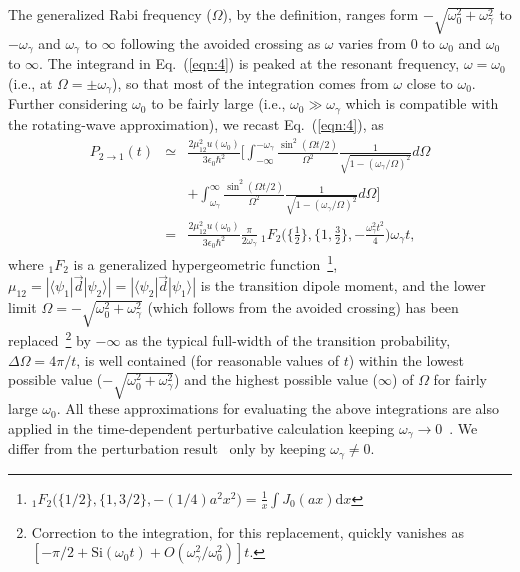 \documentclass[aps,pra,twocolumn,showpacs,preprintnumbers,amsmath,amssymb,footinbib]{revtex4}
\begin{document}
The generalized Rabi frequency ($\Omega$), by the definition, ranges form $-\sqrt{\omega_0^2+\omega_\gamma^2}$ to $-\omega_\gamma$ and $\omega_\gamma$ to $\infty$ following the avoided crossing as $\omega$ varies from $0$ to $\omega_0$ and $\omega_0$ to $\infty$. The integrand in Eq.~(\ref{eqn:4}) is peaked at the resonant frequency, $\omega=\omega_0$ (i.e., at $\Omega=\pm\omega_\gamma$), so that most of the integration comes from $\omega$ close to $\omega_0$.  Further considering $\omega_0$ to be fairly large  (i.e., $\omega_0\gg\omega_\gamma$ which is compatible with the rotating-wave approximation), we recast Eq.~(\ref{eqn:4}), as
\begin{eqnarray}\label{eqn:6}
P_{2\rightarrow1}(t)&\simeq&\frac{2\mu_{12}^2u(\omega_0)}{3\epsilon_0\hbar^2}\bigg[\int_{-\infty}^{-\omega_\gamma}\frac{\sin^2(\Omega t/2)}{\Omega^2}\frac{1}{\sqrt{1-(\omega_\gamma/\Omega)^2}}d\Omega\nonumber\\&&+\int_{\omega_\gamma}^\infty\frac{\sin^2(\Omega t/2)}{\Omega^2}\frac{1}{\sqrt{1-(\omega_\gamma/\Omega)^2}}d\Omega\bigg]\nonumber\\&=&\frac{2\mu_{12}^2u(\omega_0)}{3\epsilon_0\hbar^2}\frac{\pi}{2\omega_\gamma}~_1F_2\big(\{\frac{1}{2}\}, \{1,\frac{3}{2}\}, -\frac{\omega_\gamma^2 t^2}{4}\big)\omega_\gamma t,
\end{eqnarray}
where $_1F_2$ is a generalized hypergeometric function~\footnote{$_1F_2\big(\{1/2\}, \{1, 3/2\}, -(1/4) a^2 x^2\big)=\frac{1}{x}\int J_0(a x)\text{d}x$}, $\mu_{12}=|\langle\psi_1|\vec{d}|\psi_2\rangle|=|\langle\psi_2|\vec{d}|\psi_1\rangle|$ is the transition dipole moment, and the lower limit $\Omega=-\sqrt{\omega_0^2+\omega_\gamma^2}$ (which follows from the avoided crossing) has been replaced~\footnote{Correction to the integration, for this replacement, quickly vanishes as $[-\pi/2 + \text{Si}(\omega_0 t)+\textit{O}(\omega_\gamma^2/\omega_0^2)]t$.} by $-\infty$ as the typical full-width of the transition probability, $\Delta\Omega=4\pi/t$, is well contained (for reasonable values of $t$) within the lowest possible value ($-\sqrt{\omega_0^2+\omega_\gamma^2}$) and the highest possible value ($\infty$) of $\Omega$ for fairly large $\omega_0$. All these approximations for evaluating the above integrations are also applied in the time-dependent perturbative calculation keeping $\omega_\gamma\rightarrow0$~\cite{Dirac,Griffiths}. We differ from the perturbation result~\cite{Dirac,Griffiths} only by keeping $\omega_\gamma\neq0$.
\end{document}
